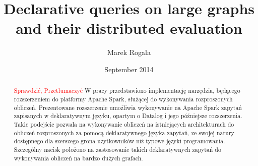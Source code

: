 \documentclass{pracamgr}
\author{Marek Rogala}
\title{Declarative queries on large graphs and their distributed evaluation}
\date{September 2014}
\theoremstyle{plain}
\theoremstyle{definition}
\theoremstyle{remark}
\newcommand{\todo}[1]{\textcolor{red}{\fbox{TODO} #1}}
\begin{document}
\maketitle

\begin{abstract}
\todo{Sprawdzić, Przetłumaczyć}
W pracy przedstawiono implementację narzędzia, będącego rozszerzeniem do platformy Apache Spark, służącej do wykonywania rozproszonych obliczeń. Prezentowane rozszerzenie umożliwia wykonywanie na Apache Spark zapytań zapisanych w deklaratywnym języku, opartym o Datalog i jego późniejsze rozszerzenia. Takie podejście pozwala na wykonywanie obliczeń na istniejących architekturach do obliczeń rozproszonych za pomocą deklaratywnego języka zapytań, ze swojej natury dostępnego dla szerszego grona użytkowników niż typowe języki programowania. Szczególny nacisk położono na zastosowanie takich deklaratywnych zapytań do wykonywania obliczeń na bardzo dużych grafach.
\end{abstract}




\tableofcontents














\end{document}
